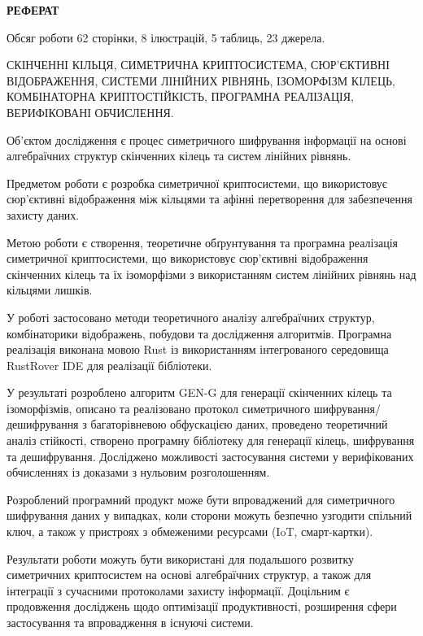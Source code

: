 \begin{center}
    \textbf{РЕФЕРАТ}
\end{center}

Обсяг роботи 62 сторінки, 8 ілюстрацій, 5 таблиць, 23 джерела.

СКІНЧЕННІ КІЛЬЦЯ, СИМЕТРИЧНА КРИПТОСИСТЕМА, СЮР’ЄКТИВНІ ВІДОБРАЖЕННЯ, СИСТЕМИ ЛІНІЙНИХ РІВНЯНЬ, ІЗОМОРФІЗМ КІЛЕЦЬ,
КОМБІНАТОРНА КРИПТОСТІЙКІСТЬ, ПРОГРАМНА РЕАЛІЗАЦІЯ, ВЕРИФІКОВАНІ ОБЧИСЛЕННЯ.

Об’єктом дослідження є процес симетричного шифрування інформації на основі алгебраїчних структур скінченних кілець та систем лінійних рівнянь.

Предметом роботи є розробка симетричної криптосистеми, що використовує сюр’єктивні відображення між кільцями та афінні
перетворення для забезпечення захисту даних.

Метою роботи є створення, теоретичне обґрунтування та програмна реалізація симетричної криптосистеми, що використовує
сюр'єктивні відображення скінченних кілець та їх ізоморфізми з використанням систем лінійних рівнянь над кільцями лишків.

У роботі застосовано методи теоретичного аналізу алгебраїчних структур, комбінаторики відображень, побудови та дослідження алгоритмів.
Програмна реалізація виконана мовою Rust із використанням інтегрованого середовища RustRover IDE для реалізації бібліотеки.

У результаті розроблено алгоритм GEN-G для генерації скінченних кілець та ізоморфізмів, описано та реалізовано протокол
симетричного шифрування/дешифрування з багаторівневою обфускацією даних, проведено теоретичний аналіз стійкості, створено
програмну бібліотеку для генерації кілець, шифрування та дешифрування.
Досліджено можливості застосування системи у верифікованих обчисленнях із доказами з нульовим розголошенням.

Розроблений програмний продукт може бути впроваджений для симетричного шифрування даних у випадках, коли сторони можуть
безпечно узгодити спільний ключ, а також у пристроях з обмеженими ресурсами (IoT, смарт-картки).

Результати роботи можуть бути використані для подальшого розвитку симетричних криптосистем на основі алгебраїчних структур,
а також для інтеграції з сучасними протоколами захисту інформації.
Доцільним є продовження досліджень щодо оптимізації продуктивності, розширення сфери застосування та впровадження в існуючі системи.